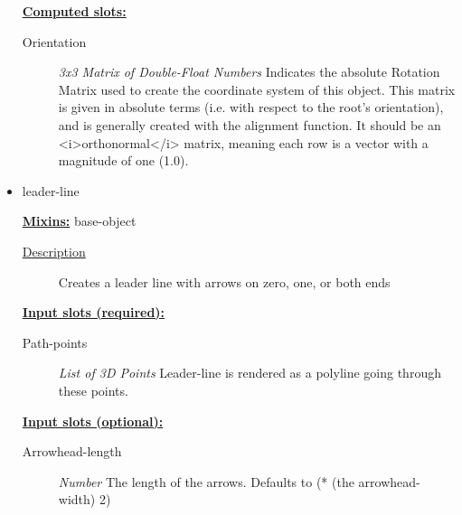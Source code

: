 \documentclass [11pt]{book}
\begin{document}
\begin{itemize}
\textbf{
\underline{Computed slots:}}

\begin{description}

\item [Orientation]
\emph{3x3 Matrix of Double-Float Numbers} Indicates the absolute Rotation Matrix used to create
the coordinate system of this object. This matrix is given in absolute terms (i.e. with
respect to the root's orientation), and is generally created with the alignment function.
It should be an <i>orthonormal</i> matrix, meaning each row is a vector with a magnitude
of one (1.0).


\end{description}







\item {}leader-line


\textbf{
\underline{Mixins:}} base-object





\begin{description}

\item [
\underline{Description}]


Creates a leader line with arrows on zero, one, or both ends



\end{description}








\textbf{
\underline{Input slots (required):}}

\begin{description}

\item [Path-points]
\emph{List of 3D Points} Leader-line is rendered as a polyline going through these points.


\end{description}






\textbf{
\underline{Input slots (optional):}}

\begin{description}

\item [Arrowhead-length]
\emph{Number} The length of the arrows. Defaults to (* (the arrowhead-width) 2)



\end{description}
\end{itemize}
\end{document}
